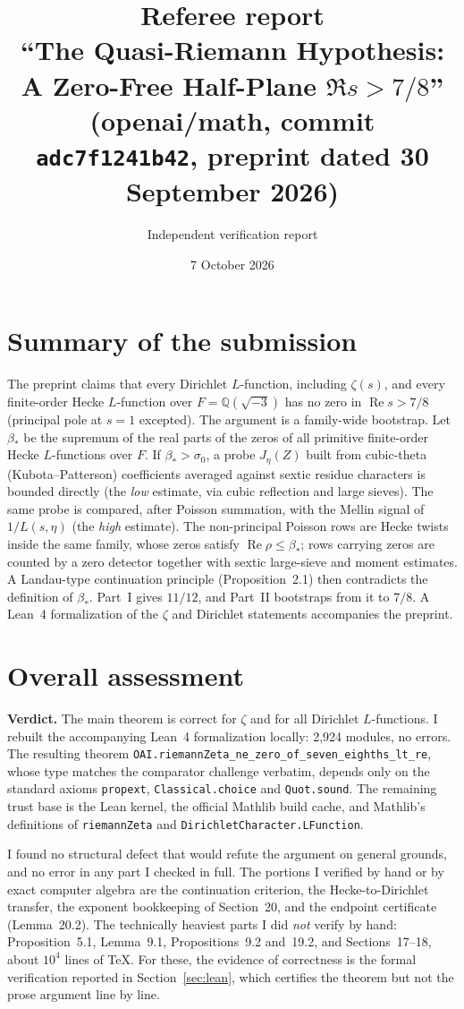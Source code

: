 \documentclass[11pt,a4paper]{article}
\title{Referee report\\[3pt]\large ``The Quasi-Riemann Hypothesis: A Zero-Free Half-Plane $\Re s>7/8$''\\
\normalsize (openai/math, commit \texttt{adc7f1241b42}, preprint dated 30 September 2026)}
\author{Independent verification report}
\date{7 October 2026}
\renewcommand{\Re}{\operatorname{Re}}
\begin{document}
\maketitle

\section{Summary of the submission}
The preprint claims that every Dirichlet $L$-function, including $\zeta(s)$, and every finite-order Hecke
$L$-function over $F=\mathbb Q(\sqrt{-3})$ has no zero in $\Re s>7/8$ (principal pole at $s=1$ excepted).
The argument is a family-wide bootstrap. Let $\beta_*$ be the supremum of the real parts of the zeros of all
primitive finite-order Hecke $L$-functions over $F$. If $\beta_*>\sigma_0$, a probe $J_\eta(Z)$ built from
cubic-theta (Kubota--Patterson) coefficients averaged against sextic residue characters is bounded directly
(the \emph{low} estimate, via cubic reflection and large sieves). The same probe is compared, after Poisson
summation, with the Mellin signal of $1/L(s,\eta)$ (the \emph{high} estimate). The non-principal Poisson rows
are Hecke twists inside the same family, whose zeros satisfy $\Re\rho\le\beta_*$; rows carrying zeros are
counted by a zero detector together with sextic large-sieve and moment estimates. A Landau-type continuation
principle (Proposition~2.1) then contradicts the definition of $\beta_*$. Part~I gives $11/12$, and Part~II
bootstraps from it to $7/8$. A Lean~4 formalization of the $\zeta$ and Dirichlet statements accompanies the
preprint.

\section{Overall assessment}
\textbf{Verdict.} The main theorem is correct for $\zeta$ and for all Dirichlet $L$-functions. I rebuilt
the accompanying Lean~4 formalization locally: 2{,}924 modules, no errors. The resulting theorem
\texttt{OAI.riemannZeta\_ne\_zero\_of\_seven\_eighths\_lt\_re}, whose type matches the comparator challenge
verbatim, depends only on the standard axioms \texttt{propext}, \texttt{Classical.choice} and
\texttt{Quot.sound}. The remaining trust base is the Lean kernel, the official Mathlib build cache, and
Mathlib's definitions of \texttt{riemannZeta} and \texttt{DirichletCharacter.LFunction}.


I found no structural defect that would refute the argument on general grounds, and no error in any part I
checked in full. The portions I verified by hand or by exact computer algebra are the continuation criterion,
the Hecke-to-Dirichlet transfer, the exponent bookkeeping of Section~20, and the endpoint certificate
(Lemma~20.2). The technically heaviest parts I did \emph{not} verify by hand: Proposition~5.1, Lemma~9.1,
Propositions~9.2 and~19.2, and Sections~17--18, about $10^4$ lines of \TeX. For these, the evidence of
correctness is the formal verification reported in Section~\ref{sec:lean}, which certifies the theorem but
not the prose argument line by line.
\end{document}
